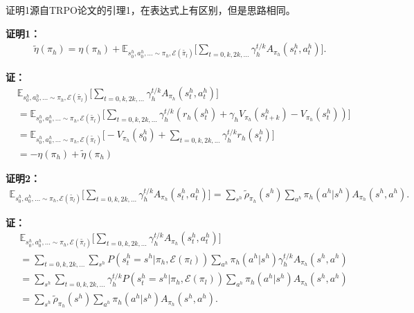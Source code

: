 \documentclass[degree=bachelor, tocarialchapter, pifootnote]{thuthesis}
\begin{document}
%

\begin{appendix}

证明1源自TRPO论文的引理1，在表达式上有区别，但是思路相同。

\textbf{证明1：}
\begin{align}
  \tilde{\eta}(\pi_h) = \eta(\pi_h) + \mathbb{E}_{s_0^h, a_0^h, ... \sim \pi_h, \mathcal{E}(\tilde{\pi_l})}\Bigg[\sum_{t=0,k,2k,...} \gamma_h^{t/k} A_{\pi_h}(s_t^h, a_t^h)\Bigg].
  \label{eq:appendix1}
\end{align}

\textbf{证：}
\begin{align}
  &\mathbb{E}_{s_0^h, a_0^h, ... \sim \pi_h, \mathcal{E}(\tilde{\pi_l})}\Bigg[\sum_{t=0,k,2k,...} \gamma_h^{t/k} A_{\pi_h}(s_t^h, a_t^h)\Bigg]\\
  &= \mathbb{E}_{s_0^h, a_0^h, ... \sim \pi_h, \mathcal{E}(\tilde{\pi_l})}\Bigg[
      \sum_{t = 0, k, 2k, ...}\gamma_h^{t/k}(r_h(s_t^h)+\gamma_h V_{\pi_h}(s_{t+k}^h) - V_{\pi_h}(s_t^h))
      \Bigg]\\
  &= \mathbb{E}_{s_0^h, a_0^h, ... \sim \pi_h, \mathcal{E}(\tilde{\pi_l})}\Bigg[
      -V_{\pi_h}(s_0^h) + \sum_{t=0,k,2k,...} \gamma_h^{t/k} r_h(s_t^h)
      \Bigg]\\
  &= -\eta(\pi_h) + \tilde{\eta}(\pi_h)
\end{align}

\textbf{证明2：}
\begin{align}
    \mathbb{E}_{s_0^h, a_0^h, ... \sim \pi_h, \mathcal{E}(\tilde{\pi_l})}\Bigg[\sum_{t=0,k,2k,...} \gamma_h^{t/k} A_{\pi_h}(s_t^h, a_t^h)\Bigg] = \sum_{s^h}\tilde{\rho}_{\pi_h}(s^h)\sum_{a^h}\pi_h(a^h|s^h)A_{\pi_h}(s^h,a^h).
\end{align}

\textbf{证：}
\begin{align}
  &\mathbb{E}_{s_0^h, a_0^h, ... \sim \pi_h, \mathcal{E}(\tilde{\pi_l})}\Bigg[\sum_{t=0,k,2k,...} \gamma_h^{t/k} A_{\pi_h}(s_t^h, a_t^h)\Bigg]\\
  &= \sum_{t = 0,k,2k,...} \sum_{s^h} P(s_t^h = s^h| \pi_h, \mathcal{E}(\pi_l)) \sum_{a^h} \pi_h(a^h|s^h) \gamma_h^{t/k} A_{\pi_h}(s^h, a^h)\\
  &= \sum_{s^h} \sum_{t = 0,k,2k,...} \gamma_h^{t/k} P(s_t^h = s^h|\pi_h, \mathcal{E}(\pi_l)) \sum_{a^h}\pi_h(a^h|s^h)A_{\pi_h}(s^h,a^h)\\
  &= \sum_{s^h}\tilde{\rho}_{\pi_h}(s^h)\sum_{a^h}\pi_h(a^h|s^h)A_{\pi_h}(s^h,a^h).
\end{align}

%
%
%

\end{appendix}

%

%
\end{document}
